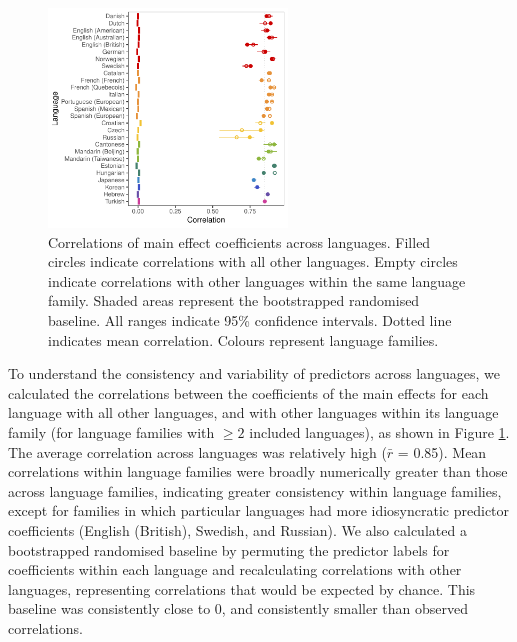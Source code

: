 \documentclass[10pt, letterpaper]{article}
\newenvironment{CodeChunk}{}{}
\begin{document}
\begin{CodeChunk}
\begin{figure}[ht]

{\centering \includegraphics[width=240px]{figs/correlations-1} 

}

\caption[Correlations of main effect coefficients across languages]{Correlations of main effect coefficients across languages. Filled circles indicate correlations with all other languages. Empty circles indicate correlations with other languages within the same language family. Shaded areas represent the bootstrapped randomised baseline. All ranges indicate 95\% confidence intervals. Dotted line indicates mean correlation. Colours represent language families.}\label{fig:correlations}
\end{figure}
\end{CodeChunk}

To understand the consistency and variability of predictors across
languages, we calculated the correlations between the coefficients of
the main effects for each language with all other languages, and with
other languages within its language family (for language families with
\(\ge 2\) included languages), as shown in Figure
\ref{fig:correlations}. The average correlation across languages was
relatively high (\(\bar{r}\) = 0.85). Mean correlations within language
families were broadly numerically greater than those across language
families, indicating greater consistency within language families,
except for families in which particular languages had more idiosyncratic
predictor coefficients (English (British), Swedish, and Russian). We
also calculated a bootstrapped randomised baseline by permuting the
predictor labels for coefficients within each language and recalculating
correlations with other languages, representing correlations that would
be expected by chance. This baseline was consistently close to 0, and
consistently smaller than observed correlations.
\end{document}
